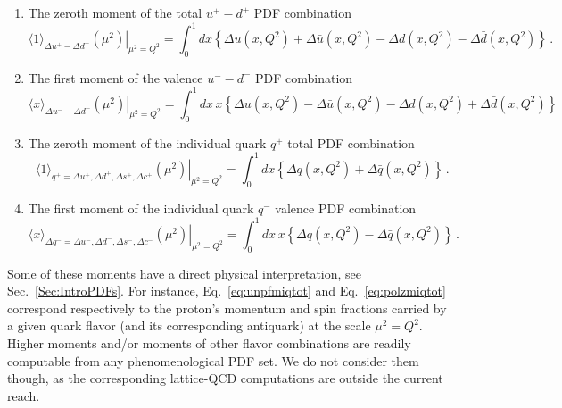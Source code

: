 \begin{itemize}
\begin{enumerate}
\item The zeroth moment of the total $u^+-d^+$ PDF combination
\begin{equation}
\left.\langle 1 \rangle_{\Delta u^+-\Delta d^+}(\mu^2)\right|_{\mu^2=Q^2}
=
\int_0^1 dx \left\{\Delta u(x,Q^2)+\Delta\bar{u}(x,Q^2)
-\Delta d(x,Q^2)-\Delta\bar{d}(x,Q^2)\right\} \, .
\label{eq:polzmumdtot}
\end{equation}

\item The first moment of the valence $u^--d^-$ PDF combination
\begin{equation}
\left.\langle x\rangle_{\Delta u^--\Delta d^-}(\mu^2)\right|_{\mu^2=Q^2}
=
\int_0^1 dx\, x\left\{\Delta u(x,Q^2)-\Delta\bar{u}(x,Q^2)-\Delta d(x,Q^2)+\Delta \bar{d}(x,Q^2)\right\}
\label{eq:polfmumdval}  
\end{equation}

\item The zeroth moment of the individual quark $q^+$ total PDF combination
\begin{equation}
\left.\langle 1\rangle_{q^+=\Delta u^+,\Delta d^+,\Delta s^+,\Delta c^+}(\mu^2)\right|_{\mu^2=Q^2}
=
\int_0^1 dx \left\{\Delta q(x,Q^2)+\Delta\bar{q}(x,Q^2)\right\} \, .
\label{eq:polzmiqtot}
\end{equation}

\item The first moment of the individual quark $q^-$ valence PDF combination
\begin{equation}
\left.\langle x\rangle_{\Delta q^-=\Delta u^-,\Delta d^-,\Delta s^-,\Delta c^-}(\mu^2)\right|_{\mu^2=Q^2}
=
\int_0^1 dx\, x\left\{\Delta q(x,Q^2)-\Delta\bar{q}(x,Q^2)\right\} \, .
\label{eq:polfmiqval}
\end{equation}

\end{enumerate}

\end{itemize}

Some of these moments have a direct physical interpretation, see 
Sec.~\ref{Sec:IntroPDFs}.
%
For instance, Eq.~\eqref{eq:unpfmiqtot} and Eq.~\eqref{eq:polzmiqtot}
correspond respectively to the proton's momentum and spin fractions carried
by a given quark flavor (and its corresponding antiquark) at the scale 
$\mu^2=Q^2$.
%
Higher moments and/or moments of other flavor combinations are readily
computable from any phenomenological PDF set.
%
We do not consider them though, as the corresponding lattice-QCD
computations are outside the current reach.
